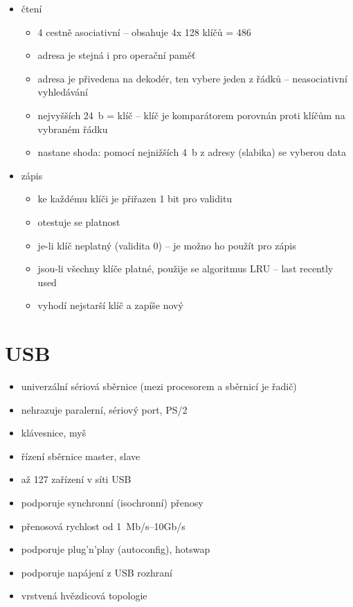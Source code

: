 \documentclass[a4paper,12pt]{article}
\providecommand{\tightlist}{%
\setlength{\itemsep}{0pt}\setlength{\parskip}{0pt}}
\begin{document}
\begin{itemize}
  \tightlist
  \item čtení
  \begin{itemize}
    \tightlist
    \item 4 cestně asociativní -- obsahuje 4x 128 klíčů = 486
    \item adresa je stejná i pro operační paměť
    \item adresa je přivedena na dekodér, ten vybere jeden z řádků --
    neasociativní vyhledávání
    \item nejvyšších 24~b = klíč -- klíč je komparátorem porovnán proti klíčům
    na vybraném řádku
    \item nastane shoda: pomocí nejnižších 4~b z adresy (slabika) se vyberou data
  \end{itemize}
  \item zápis
  \begin{itemize}
    \tightlist
    \item ke každému klíči je přiřazen 1 bit pro validitu
    \item otestuje se platnost
    \item je-li klíč neplatný (validita 0) -- je možno ho použít pro zápis
    \item jsou-li všechny klíče platné, použije se algoritmus LRU -- last
    recently used
    \item vyhodí nejstarší klíč a zapíše nový
  \end{itemize}
\end{itemize}

\section{USB}

\begin{itemize}
  \tightlist
  \item univerzální sériová sběrnice (mezi procesorem a sběrnicí je řadič)
  \item nehrazuje paralerní, sériový port, PS/2
  \item klávesnice, myš
  \item řízení sběrnice master, slave
  \item až 127 zařízení v síti USB
  \item podporuje synchronní (isochronní) přenosy
  \item přenosová rychlost od 1~Mb/s--10Gb/s
  \item podporuje plug'n'play (autoconfig), hotswap
  \item podporuje napájení z USB rozhraní
  \item vrstvená hvězdicová topologie
\end{itemize}
\end{document}
